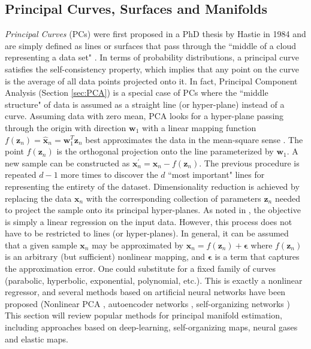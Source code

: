 \subsection{Principal Curves, Surfaces and Manifolds} \label{sec:Principal_Manifolds}
\textit{Principal Curves} (PCs) were first proposed in a PhD thesis by Hastie in 1984 and are simply defined as lines or surfaces that pass through the ``middle of a cloud representing a data set" \citep{Kegl2008PrincipalManifoldsTextbook,Gorban2007ElasticMaps}.  In terms of probability distributions, a principal curve satisfies the self-consistency property, which implies that any point on the curve is the average of all data points projected onto it.  In fact, Principal Component Analysis (Section \ref{sec:PCA}) is a special case of PCs where the ``middle structure" of data is assumed as a straight line (or hyper-plane) instead of a curve.  Assuming data with zero mean, PCA looks for a hyper-plane passing through the origin with direction $\bm{w}_{1}$ with a linear mapping function $f(\bm{z}_{n}) = \hat{\bm{x}}_{n} = \bm{w}^{T}_{1}\bm{z}_{n}$ best approximates the data in the mean-square sense \citep{Sorzano2014DRReview, Murphy2012}.  The point $f(\bm{z}_{n})$  is the orthogonal projection onto the line parameterized by $\bm{w}_{1}$.  A new sample can be constructed as $\bm{x}^{'}_{n} = \bm{x}_{n} - f(\bm{z}_{n})$.  The previous procedure is repeated $d-1$ more times to discover the $d$ ``most important" lines for representing the entirety of the dataset.  Dimensionality reduction is achieved by replacing the data $\bm{x}_{n}$ with the corresponding collection of parameters $\bm{z}_{n}$ needed to project the sample onto its principal hyper-planes.  As noted in \citep{Sorzano2014DRReview}, the objective is simply a linear regression on the input data.  However, this process does not have to be restricted to lines (or hyper-planes).  In general, it can be assumed that a given sample $\bm{x}_{n}$ may be approximated by $\bm{x}_{n} = f(\bm{z}_{n}) + \bm{\epsilon}$ where $f(\bm{z}_{n})$ is an arbitrary (but sufficient) nonlinear mapping, and $\bm{\epsilon}$ is a term that captures the approximation error.   One could substitute for a fixed family of curves (parabolic, hyperbolic, exponential, polynomial, etc.).  This is exactly a nonlinear regressor, and several methods based on artificial neural networks have been proposed (Nonlinear PCA \citep{Kramer1991NonlinearPCA}, autoencoder networks \citep{Goodfellow2016DeepLearning}, self-organizing networks \citep{Kohonen1990SOM,Fritzke1995GrowingNeuralGas})  This section will review popular methods for principal manifold estimation, including approaches based on deep-learning, self-organizing maps, neural gases and elastic maps. 

